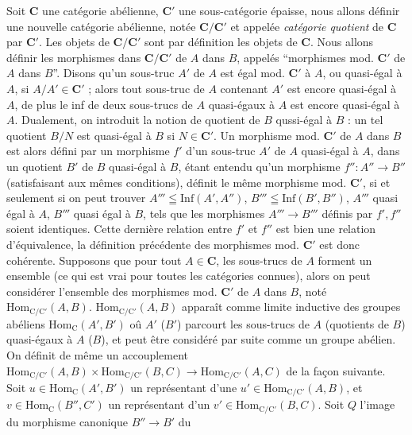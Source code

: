 Soit $\mathbf{C}$ une catégorie abélienne, $\mathbf{C}'$ une sous-catégorie épaisse, nous allons
définir une nouvelle catégorie abélienne, notée $\mathbf{C}/\mathbf{C}'$ et appelée
\textit{catégorie quotient} de $\mathbf{C}$ par $\mathbf{C}'$. Les objets de $\mathbf{C}/\mathbf{C}'$ sont par
définition les objets de $\mathbf{C}$. Nous allons définir les morphismes dans $\mathbf{C}/\mathbf{C}'$
de $A$ dans $B$, appelés ``morphismes mod. $\mathbf{C}'$ de $A$ dans $B$''.
Disons qu'un sous-truc $A'$ de $A$ est égal mod. $\mathbf{C}'$ à $A$, ou quasi-égal à
$A$, si $A/A'\in \mathbf{C}'$ ; alors tout sous-truc de $A$ contenant $A'$ est encore
quasi-égal à $A$, de plus le inf de deux sous-trucs de $A$ quasi-égaux à $A$
est encore quasi-égal à $A$. Dualement, on introduit la notion de quotient de
$B$ qussi-égal à $B$ : un tel quotient $B/N$ est quasi-égal à $B$ si
$N\in \mathbf{C}'$.
Un morphisme mod. $\mathbf{C}'$ de $A$ dans $B$ est alors défini par un morphisme $f'$
d'un sous-truc $A'$ de $A$ quasi-égal à $A$, dans un quotient $B'$ de $B$
quasi-égal à $B$, étant entendu qu'un morphisme
$f'':A''\to B''$ (satisfaisant aux mêmes conditions), définit le
même morphisme mod. $\mathbf{C}'$, si et seulement si on peut trouver
$A'''\leqq\mathrm{Inf}(A',A'')$, $B'''\leqq\mathrm{Inf}(B',B'')$, $A'''$ quasi
égal à $A$, $B'''$ quasi égal à $B$, tels que les morphismes
$A'''\to B'''$ définis par $f',f''$ soient identiques. Cette
dernière relation entre $f'$ et $f''$ est bien une relation d'équivalence, la
définition précédente des morphismes mod. $\mathbf{C}'$ est donc cohérente.
Supposons que pour tout $A\in \mathbf{C}$, les sous-trucs de $A$ forment un ensemble
(ce qui est vrai pour toutes les catégories connues), alors on peut
considérer l'ensemble des morphismes mod. $\mathbf{C}'$ de $A$ dans $B$, noté
$\mathrm{Hom}_{\mathrm{C}/\mathrm{C}'}(A,B)$. $\mathrm{Hom}_{\mathrm{C}/\mathrm{C}'}(A,B)$ apparaît comme limite
inductive des groupes abéliens $\mathrm{Hom}_{\mathrm{C}}(A',B')$ oû $A'$ ($B'$)
parcourt les sous-trucs de $A$ (quotients de $B$) quasi-égaux à $A$ ($B$), et
peut être considéré par suite comme un groupe abélien.
On définit de même un accouplement
$\mathrm{Hom}_{\mathrm{C}/\mathrm{C}'}(A,B)\times\mathrm{Hom}_{\mathrm{C}/\mathrm{C}'}(B,C)  \to\mathrm{Hom}_{\mathrm{C}/\mathrm{C}'}(A,C)$ de la façon suivante. Soit $u\in\mathrm{Hom}_{\mathrm{C}}(A',B')$ un
représentant d'une $u'\in\mathrm{Hom}_{\mathrm{C}/\mathrm{C}'}(A,B)$, et
$v\in\mathrm{Hom}_{\mathrm{C}}(B'',C')$ un représentant d'un
$v'\in\mathrm{Hom}_{\mathrm{C}/\mathrm{C}'}(B,C)$. Soit $Q$ l'image du morphisme canonique
$B''\to B'$ du

